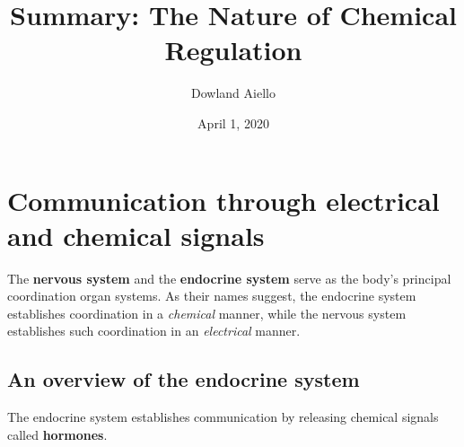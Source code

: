 \documentclass{article}
\begin{document}
\title{Summary: The Nature of Chemical Regulation}
\author{Dowland Aiello}
\date{April 1, 2020}

\maketitle
\tableofcontents
\fancyhf{}

\newpage

\section{Communication through electrical and chemical signals}

The \textbf{nervous system} and the \textbf{endocrine system} serve as the
body's principal coordination organ systems. As their names suggest, the
endocrine system establishes coordination in a \emph{chemical} manner, while the
nervous system establishes such coordination in an \emph{electrical} manner.

\subsection{An overview of the endocrine system}

The endocrine system establishes communication by releasing chemical signals
called \textbf{hormones}.
\end{document}
